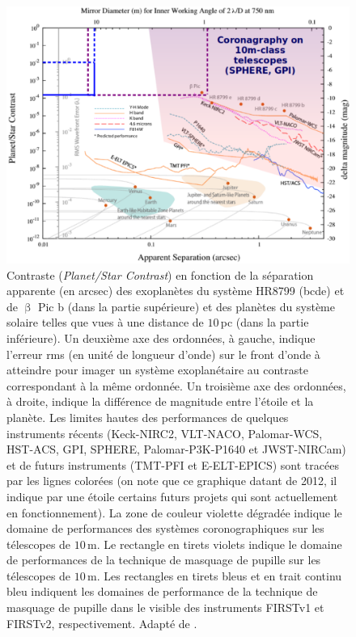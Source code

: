 \begin{figure}[ht!]
    \centering
    \includegraphics[width=\figwidth]{Figure_Chap1/Mawet2012_ContrastVSSeparation_InstruPerformances_02.png}
    \caption[Contraste en fonction de la séparation apparente de certaines exoplanètes imagées et des planètes du système solaire.]{Contraste (\textit{Planet/Star Contrast}) en fonction de la séparation apparente (en arcsec) des exoplanètes du système HR8799 (bcde) et de $\upbeta$ Pic b (dans la partie supérieure) et des planètes du système solaire telles que vues à une distance de $10 \,$pc (dans la partie inférieure). Un deuxième axe des ordonnées, à gauche, indique l'erreur rms (en unité de longueur d'onde) sur le front d'onde à atteindre pour imager un système exoplanétaire au contraste correspondant à la même ordonnée. Un troisième axe des ordonnées, à droite, indique la différence de magnitude entre l'étoile et la planète. Les limites hautes des performances de quelques instruments récents (Keck-NIRC2, VLT-NACO, Palomar-WCS, HST-ACS, GPI, SPHERE, Palomar-P3K-P1640 et JWST-NIRCam) et de futurs instruments (TMT-PFI et E-ELT-EPICS) sont tracées par les lignes colorées (on note que ce graphique datant de 2012, il indique par une étoile certains futurs projets qui sont actuellement en fonctionnement). La zone de couleur violette dégradée indique le domaine de performances des systèmes coronographiques sur les télescopes de $10 \,$m. Le rectangle en tirets violets indique le domaine de performances de la technique de masquage de pupille sur les télescopes de $10 \,$m. Les rectangles en tirets bleus et en trait continu bleu indiquent les domaines de performance de la technique de masquage de pupille dans le visible des instruments FIRSTv1 et FIRSTv2, respectivement. Adapté de \cite{mawet2012}.}
    \label{fig:ContrastSeparation}
\end{figure}


